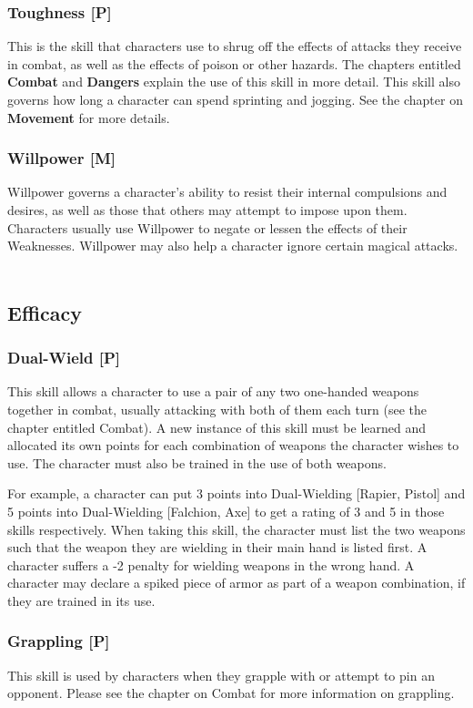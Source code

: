 \documentclass[oneside]{book}
\begin{document}
\begin{multicols}{2}
\subsubsection{Toughness [P]}
This is the skill that characters use to shrug off the effects of attacks they receive in combat, as well as the effects of poison or other hazards. The chapters entitled \textbf{Combat} and \textbf{Dangers} explain the use of this skill in more detail. This skill also governs how long a character can spend sprinting and jogging. See the chapter on \textbf{Movement} for more details.

\subsubsection{Willpower [M]}
Willpower governs a character's ability to resist their internal compulsions and desires, as well as those that others may attempt to impose upon them. Characters usually use Willpower to negate or lessen the effects of their Weaknesses. Willpower may also help a character ignore certain magical attacks.
\\
\\
\subsection{Efficacy}
\subsubsection{Dual-Wield [P]}
This skill allows a character to use a pair of any two one-handed weapons together in combat, usually attacking with both of them each turn (see the chapter entitled Combat). A new instance of this skill must be learned and allocated its own points for each combination of weapons the character wishes to use. The character must also be trained in the use of both weapons. 

For example, a character can put 3 points into Dual-Wielding [Rapier, Pistol] and 5 points into Dual-Wielding [Falchion, Axe] to get a rating of 3 and 5 in those skills respectively. When taking this skill, the character must list the two weapons such that the weapon they are wielding in their main hand is listed first. A character suffers a -2 penalty for wielding weapons in the wrong hand. A character may declare a spiked piece of armor as part of a weapon combination, if they are trained in its use. 

\subsubsection{Grappling [P]}
This skill is used by characters when they grapple with or attempt to pin an opponent. Please see the chapter on Combat for more information on grappling.


\end{multicols}
\end{document}
